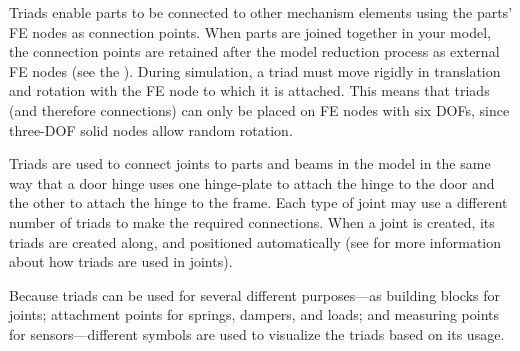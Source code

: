 %
%

%
%



Triads enable parts to be connected to other mechanism elements using
the parts' FE nodes as connection points. When parts are joined together
in your model, the connection points are retained after the model
reduction process as external FE nodes
(see the ).
During simulation, a triad must move rigidly in translation and
rotation with the FE node to which it is attached. This means that
triads (and therefore connections) can only be placed on FE nodes with
six DOFs, since three-DOF solid nodes allow random rotation.



Triads are used to connect joints to parts and beams in the model in the
same way that a door hinge uses one hinge-plate to attach the hinge to
the door and the other to attach the hinge to the frame. Each type of
joint may use a different number of triads to make the required
connections. When a joint is created, its triads are created along, and
positioned automatically (see  for more
information about how triads are used in joints).



Because triads can be used for several different purposes---as building
blocks for joints; attachment points for springs, dampers, and loads;
and measuring points for sensors---different symbols are used to
visualize the triads based on its usage.

